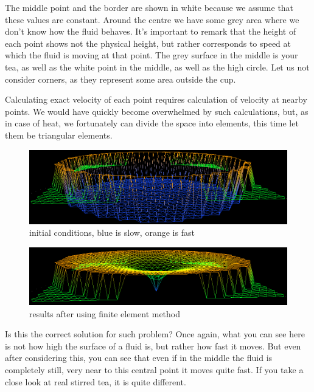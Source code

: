 \documentclass[a4paper,12pt]{article}
\begin{document}
The middle point and the border are shown in white because we assume that these values are constant. Around the centre
we have some grey area where we don't know how the fluid behaves. It's important to remark that the height of each point
shows not the physical height, but rather corresponds to speed at which the fluid is moving at that point. The grey
surface in the middle is your tea, as well as the white point in the middle, as well as the high circle. Let us not
consider corners, as they represent some area outside the cup.

Calculating exact velocity of each point requires calculation of velocity at nearby points. We would have quickly become
overwhelmed by such calculations, but, as in case of heat, we fortunately can divide the space into elements, this time
let them be triangular elements.

\begin{figure}[H]
\begin{center}
  \includegraphics[width=\textwidth]{flow_before}
\end{center}
\caption{initial conditions, blue is slow, orange is fast}
\end{figure}

\begin{figure}[H]
\begin{center}
  \includegraphics[width=\textwidth]{flow_after}
\end{center}
\caption{results after using finite element method}
\end{figure}

Is this the correct solution for such problem? Once again, what you can see here is not how high the surface of a fluid
is, but rather how fast it moves. But even after considering this, you can see that even if in the middle the fluid is
completely still, very near to this central point it moves quite fast. If you take a close look at real stirred tea, it
is quite different.
\end{document}
